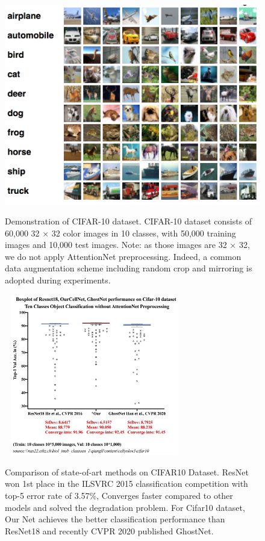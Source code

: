 \begin{figure}[ht]
\begin{center}
\includegraphics[height=0.3\textheight]{thesis-template-master/images/cifardataset.png}
\label{fig:cellnet}
\end{center}
\caption{Demonstration of CIFAR-10 dataset. CIFAR-10 dataset consists of 60,000  32 × 32 color images in 10 classes, with 50,000 training images and 10,000 test images. Note: as those images are  32 × 32, we do not apply AttentionNet preprocessing. Indeed, a common data augmentation scheme including random crop and mirroring is adopted during experiments.}
\end{figure}




\begin{figure}[t]
\begin{center}
\includegraphics[height=200pt,width=0.7\textwidth]{thesis-template-master/images/Cifar-12-06-2020.png}
\label{fig:cellnet}
\end{center}
\caption{Comparison of state-of-art methods on CIFAR10 Dataset.  ResNet won 1st place in the ILSVRC 2015 classification competition with top-5 error rate of 3.57\%, Converges faster compared to other models and solved the degradation problem. For Cifar10 dataset, Our Net achieves the better classification performance than ResNet18 and recently CVPR 2020 published GhostNet.}
\end{figure}


